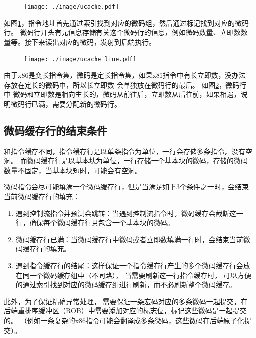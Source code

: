 \begin{figure}[!htbp]
  \centering
  \texttt{[image: ./image/ucache.pdf]}
  \label{img:ucache}
\end{figure}

如图\ref{img:ucache}，指令地址首先通过索引找到对应的微码组，然后通过标记找到对应的微码行。
微码行开头有元信息存储有关这个微码行的信息，例如微码数量、立即数数量等。接下来读出对应的微码，发射到后端执行。

\begin{figure}[!htbp]
  \centering
  \texttt{[image: ./image/ucache\_line.pdf]}
  \label{img:ucache_line}
\end{figure}

由于x86是变长指令集，微码是定长指令集，如果x86指令中有长立即数，没办法存放在定长的微码中，所以长立即数
会单独放在微码行的最后。
如图\ref{img:ucache_line}，微码行中
微码和立即数是相向生长的，微码从前往后，立即数从后往前，如果相遇，说明微码行已满，需要分配新的微码行。


\subsection{微码缓存行的结束条件}\label{sec:ucache_end}

和指令缓存不同，指令缓存行是以单条指令为单位，一行会存储多条指令，没有空洞。
而微码缓存行是以基本块为单位，一行存储一个基本块的微码，存储的微码数量不固定，当基本块短时，可能会有空洞。

微码指令会尽可能填满一个微码缓存行，但是当满足如下3个条件之一时，会结束当前微码缓存行的填充\cite{solomonMicrooperationCachePower2001}：
\begin{enumerate}
  \item 遇到控制流指令并预测会跳转：当遇到控制流指令时，微码缓存会截断这一行，确保每个微码缓存行只包含一个基本块的微码。
  \item 微码缓存行已满：当微码缓存行中微码或者立即数填满一行时，会结束当前微码缓存行的填充。
  \item 遇到指令缓存行的结尾：这样保证一个指令缓存行产生的多个微码缓存行会放在同一个微码缓存组中（不同路），
  当需要刷新这一行指令缓存时， 可以方便的通过索引找到对应的微码缓存组进行刷新，而不必刷新整个微码缓存。
\end{enumerate}

此外，为了保证精确异常处理，
需要保证一条宏码对应的多条微码一起提交，在后端重排序缓冲区（ROB）中需要添加对应的标志位，标记这些微码是一起提交的。
（例如一条复杂的x86指令可能会翻译成多条微码，这些微码在后端原子化提交）。

